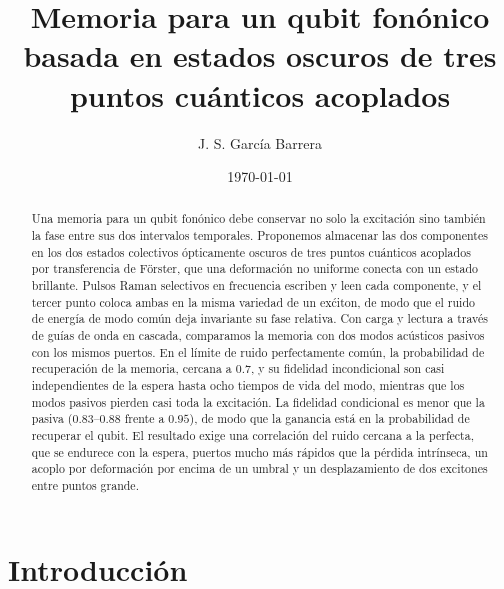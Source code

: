 \documentclass[aps,pra,twocolumn,groupedaddress,amsmath,amssymb,floatfix]{revtex4-2}
\begin{document}
\title{Memoria para un qubit fon\'onico basada en estados oscuros de tres puntos cu\'anticos acoplados}

\author{J. S. Garc\'ia Barrera}

\date{\today}

\begin{abstract}
Una memoria para un qubit fon\'onico debe conservar no solo la excitaci\'on sino tambi\'en la fase entre sus dos intervalos temporales. Proponemos almacenar las dos componentes en los dos estados colectivos \'opticamente oscuros de tres puntos cu\'anticos acoplados por transferencia de F\"orster, que una deformaci\'on no uniforme conecta con un estado brillante. Pulsos Raman selectivos en frecuencia escriben y leen cada componente, y el tercer punto coloca ambas en la misma variedad de un ex\'citon, de modo que el ruido de energ\'ia de modo com\'un deja invariante su fase relativa. Con carga y lectura a trav\'es de gu\'ias de onda en cascada, comparamos la memoria con dos modos ac\'usticos pasivos con los mismos puertos. En el l\'imite de ruido perfectamente com\'un, la probabilidad de recuperaci\'on de la memoria, cercana a $0.7$, y su fidelidad incondicional son casi independientes de la espera hasta ocho tiempos de vida del modo, mientras que los modos pasivos pierden casi toda la excitaci\'on. La fidelidad condicional es menor que la pasiva ($0.83$--$0.88$ frente a $0.95$), de modo que la ganancia est\'a en la probabilidad de recuperar el qubit. El resultado exige una correlaci\'on del ruido cercana a la perfecta, que se endurece con la espera, puertos mucho m\'as r\'apidos que la p\'erdida intr\'inseca, un acoplo por deformaci\'on por encima de un umbral y un desplazamiento de dos excitones entre puntos grande.
\end{abstract}

\maketitle

\section{Introducci\'on}
\label{sec:intro}
\end{document}
